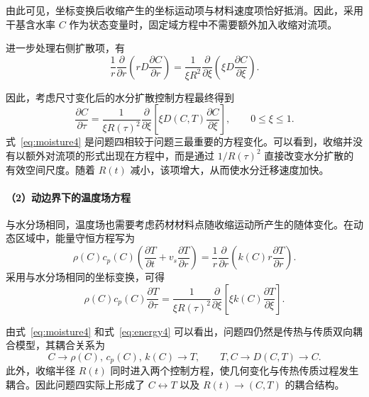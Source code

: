 \documentclass[12pt,a4paper]{article}
\begin{document}
由此可见，坐标变换后收缩产生的坐标运动项与材料速度项恰好抵消。因此，采用干基含水率 \(C\) 作为状态变量时，固定域方程中不需要额外加入收缩对流项。

进一步处理右侧扩散项，有
\begin{equation}
\frac{1}{r}
\frac{\partial}{\partial r}
\left(
rD\frac{\partial C}{\partial r}
\right)
=
\frac{1}{\xi R^2}
\frac{\partial}{\partial\xi}
\left(
\xi D
\frac{\partial C}{\partial\xi}
\right).
\label{eq:diff_transform4}
\end{equation}

因此，考虑尺寸变化后的水分扩散控制方程最终得到
\begin{equation}
\boxed{
\frac{\partial C}{\partial\tau}
=
\frac{1}{\xi R(\tau)^2}
\frac{\partial}{\partial\xi}
\left[
\xi D(C,T)
\frac{\partial C}{\partial\xi}
\right]
},
\qquad
0\le\xi\le1.
\label{eq:moisture4}
\end{equation}
式~\eqref{eq:moisture4} 是问题四相较于问题三最重要的方程变化。可以看到，收缩并没有以额外对流项的形式出现在方程中，而是通过 \(1/R(\tau)^2\) 直接改变水分扩散的有效空间尺度。随着 \(R(t)\) 减小，该项增大，从而使水分迁移速度加快。

\paragraph{（2）动边界下的温度场方程}

与水分场相同，温度场也需要考虑药材材料点随收缩运动所产生的随体变化。在动态区域中，能量守恒方程写为
\begin{equation}
\rho(C)c_p(C)
\left(
\frac{\partial T}{\partial t}
+
v_s\frac{\partial T}{\partial r}
\right)
=
\frac{1}{r}
\frac{\partial}{\partial r}
\left(
k(C)r\frac{\partial T}{\partial r}
\right).
\label{eq:energy_dynamic4}
\end{equation}
采用与水分场相同的坐标变换，可得
\begin{equation}
\boxed{
\rho(C)c_p(C)
\frac{\partial T}{\partial\tau}
=
\frac{1}{\xi R(\tau)^2}
\frac{\partial}{\partial\xi}
\left[
\xi k(C)
\frac{\partial T}{\partial\xi}
\right]
}.
\label{eq:energy4}
\end{equation}

由式~\eqref{eq:moisture4} 和式~\eqref{eq:energy4} 可以看出，问题四仍然是传热与传质双向耦合模型，其耦合关系为
\begin{equation}
C
\longrightarrow
\rho(C),\,c_p(C),\,k(C)
\longrightarrow
T,
\qquad
T,C
\longrightarrow
D(C,T)
\longrightarrow
C.
\end{equation}
此外，收缩半径 \(R(t)\) 同时进入两个控制方程，使几何变化与传热传质过程发生耦合。因此问题四实际上形成了 \(C\leftrightarrow T\) 以及 \(R(t)\rightarrow(C,T)\) 的耦合结构。
\end{document}

